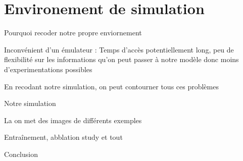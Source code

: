 \documentclass{beamer}
\begin{document}
	\section{Environement de simulation}
	
	\begin{frame}{Pourquoi recoder notre propre enviornement}
		
		Inconvénient d'un émulateur : Temps d'accès potentiellement long, peu de flexibilité sur les informations qu'on peut passer à notre modèle donc moins d'experimentations possibles
		
		En recodant notre simulation, on peut contourner tous ces problèmes 
		
	\end{frame}
	
	\begin{frame}{Notre simulation}
		
		La on met des images de différents exemples
		
	\end{frame}
	
	\begin{frame}{Entraînement, abblation study et tout}
	\end{frame}
	
	\begin{frame}{Conclusion}
		
		
		
	\end{frame}
	
\end{document}
